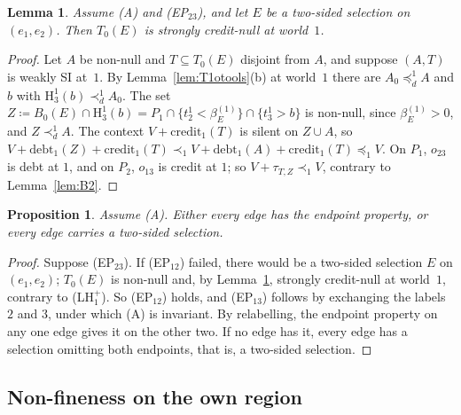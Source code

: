 \documentclass[11pt]{article}
\newtheorem{lemma}[theorem]{Lemma}
\newtheorem{proposition}[theorem]{Proposition}
\theoremstyle{definition}\newtheorem{definition}[theorem]{Definition}
\theoremstyle{remark}\newtheorem{remark}[theorem]{Remark}
\newcommand{\debt}{\mathrm{debt}}
\newcommand{\cred}{\mathrm{credit}}
\newcommand{\Hi}[3]{\mathrm H^{#1}_{#2}(#3)}
\begin{document}
\begin{lemma}\label{lem:B3}
Assume (A) and (EP$_{23}$), and let $E$ be a two-sided selection on
$(e_1,e_2)$. Then $T_0(E)$ is strongly credit-null at world~$1$.
\end{lemma}
\begin{proof}
Let $A$ be non-null and $T\subseteq T_0(E)$ disjoint from $A$, and suppose
$(A,T)$ is weakly SI at~$1$. By Lemma~\ref{lem:T1otools}(b) at world~$1$
there are $A_0\preceq^1_dA$ and $b$ with $\Hi13b\prec^1_dA_0$. The set
$Z\coloneqq B_0(E)\cap\Hi13b=P_1\cap\{t^1_2<\beta^{(1)}_E\}\cap\{t^1_3>b\}$
is non-null, since $\beta^{(1)}_E>0$, and $Z\prec^1_dA$. The context
$V+\cred_1(T)$ is silent on $Z\cup A$, so
$V+\debt_1(Z)+\cred_1(T)\prec_1V+\debt_1(A)+\cred_1(T)\preceq_1V$. On $P_1$,
$o_{23}$ is debt at $1$, and on $P_2$, $o_{13}$ is credit at $1$; so
$V+\tau_{T,Z}\prec_1V$, contrary to Lemma~\ref{lem:B2}.
\end{proof}

\begin{proposition}\label{prop:dichotomy}
Assume (A). Either every edge has the endpoint property, or every edge
carries a two-sided selection.
\end{proposition}
\begin{proof}
Suppose (EP$_{23}$). If (EP$_{12}$) failed, there would be a two-sided
selection $E$ on $(e_1,e_2)$; $T_0(E)$ is non-null and, by
Lemma~\ref{lem:B3}, strongly credit-null at world~$1$, contrary to
(LH$^+_1$). So (EP$_{12}$) holds, and (EP$_{13}$) follows by exchanging the
labels $2$ and $3$, under which (A) is invariant. By relabelling, the
endpoint property on any one edge gives it on the other two. If no edge has
it, every edge has a selection omitting both endpoints, that is, a
two-sided selection.
\end{proof}

\subsection{Non-fineness on the own region}\label{sec:own}
\end{document}
